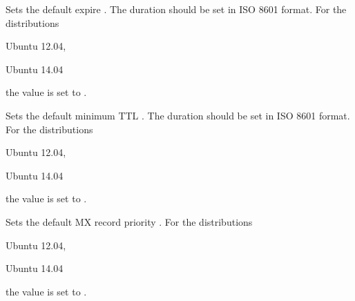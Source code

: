 Sets the default expire . The duration should be set in 
ISO 8601 format.
For the distributions
\begin{inparaitem}
\item[\TheDistribution{ubuntu}] Ubuntu 12.04,
\item[\TheDistribution{ubuntu}] Ubuntu 14.04
\end{inparaitem}
the value is set to .


Sets the default minimum TTL . The duration should be set in 
ISO 8601 format.
For the distributions
\begin{inparaitem}
\item[\TheDistribution{ubuntu}] Ubuntu 12.04,
\item[\TheDistribution{ubuntu}] Ubuntu 14.04
\end{inparaitem}
the value is set to .


Sets the default MX record priority .
For the distributions
\begin{inparaitem}
\item[\TheDistribution{ubuntu}] Ubuntu 12.04,
\item[\TheDistribution{ubuntu}] Ubuntu 14.04
\end{inparaitem}
the value is set to .
